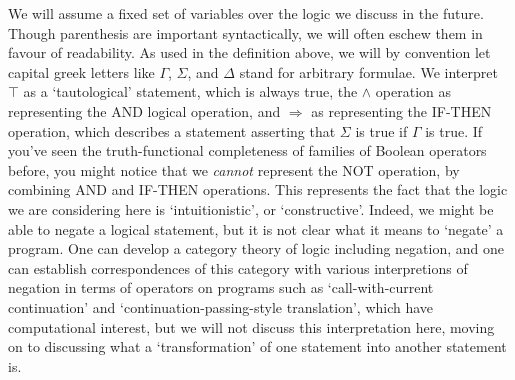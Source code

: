 \documentclass{article}
\theoremstyle{plain}
\begin{document}
We will assume a fixed set of variables over the logic we discuss in the future. Though parenthesis are important syntactically, we will often eschew them in favour of readability. As used in the definition above, we will by convention let capital greek letters like $\Gamma$, $\Sigma$, and $\Delta$ stand for arbitrary formulae. We interpret $\top$ as a `tautological' statement, which is always true, the $\wedge$ operation as representing the AND logical operation, and $\Rightarrow$ as representing the IF-THEN operation, which describes a statement asserting that $\Sigma$ is true if $\Gamma$ is true. If you've seen the truth-functional completeness of families of Boolean operators before, you might notice that we {\it cannot} represent the NOT operation, by combining AND and IF-THEN operations. This represents the fact that the logic we are considering here is `intuitionistic', or `constructive'. Indeed, we might be able to negate a logical statement, but it is not clear what it means to `negate' a program. One can develop a category theory of logic including negation, and one can establish correspondences of this category with various interpretions of negation in terms of operators on programs such as `call-with-current continuation' and `continuation-passing-style translation', which have computational interest, but we will not discuss this interpretation here, moving on to discussing what a `transformation' of one statement into another statement is.
\end{document}
